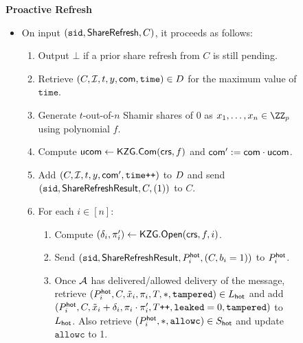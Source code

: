 \begin{savenotes}
\begin{figure*}
{{    %
    \textbf{Proactive Refresh}
    \begin{itemize}
    \item On input $(\texttt{sid},\mathsf{ShareRefresh},C)$, it proceeds as follows:
        \begin{enumerate}
        \item Output $\bot$ if a prior share refresh from $C$ is still pending.\footnotemark
        \item Retrieve $(C, \mathcal{I}, t, y, \mathsf{com}, \texttt{time}) \in D$ for the maximum value of $\texttt{time}$. 
        \item Generate $t$-out-of-$n$ Shamir shares of $0$ as $x_1, \ldots, x_n \in \ZZ_p$ using polynomial $f$. 
        \item Compute $\mathsf{ucom} \gets \mathsf{KZG}.\mathsf{Com}(\mathsf{crs}, f)$ and $\mathsf{com}' := \mathsf{com} \cdot \mathsf{ucom}$.
        \item Add $(C, \mathcal{I}, t, y, \mathsf{com}', \texttt{time++})$ to $D$ and send $(\texttt{sid}, \mathsf{ShareRefresh}\mathsf{Result}, C, (1))$ to $C$.
        \item For each $i \in [n]$: 
        \begin{enumerate}
            \item Compute $(\delta_i, \pi_i') \gets \mathsf{KZG}.\mathsf{Open}(\mathsf{crs}, f, i)$. %
            \item Send $(\texttt{sid}, \mathsf{ShareRefresh}\mathsf{Result}, P_i^{\mathsf{hot}}, (C, b_i=1))$ to $P_i^{\mathsf{hot}}$. 
            \item Once $\mathcal{A}$ has delivered/allowed delivery of the message, retrieve $(P_i^{\mathsf{hot}}, C, \tilde{x}_i, \pi_i,\allowbreak T,  *, \texttt{tampered}) \in L_{\mathsf{hot}}$ and add $(P_i^{\mathsf{hot}}, C, \tilde{x}_i+\delta_i, \pi_i \cdot \pi_i', T\texttt{++}, \texttt{leaked} = 0, \texttt{tampered})$ to $L_{\mathsf{hot}}$. Also retrieve $(P_i^{\mathsf{hot}}, *, \texttt{allowc}) \in S_{\mathsf{hot}}$ and update $\texttt{allowc}$ to 1.

\end{enumerate}
\end{enumerate}
\end{itemize}}}
\end{figure*}
\end{savenotes}
